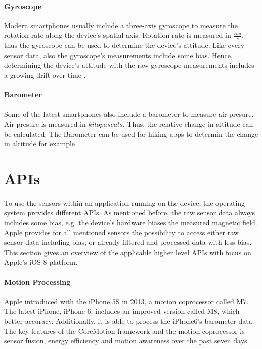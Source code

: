 \paragraph{Gyroscope}

Modern smartphones usually include a three-axis gyroscope to measure the rotation rate along the device's spatial axis.
Rotation rate is measured in $\frac{rad}{s}$, thus the gyroscope can be used to determine the device's attitude.
Like every sensor data, also the gyroscope's measurements include some bias.
Hence, determining the device's attitude with the raw gyroscope measurements includes a growing drift over time \cite{apple:ios_doc_cm, apple:wwdc_2012_pham}.


\paragraph{Barometer}

Some of the latest smartphones also include a barometer to measure air presure.
Air presure is measured in $kilopascals$.
Thus, the relative change in altitude can be calculated.
The Barometer can be used for hiking apps to determin the change in altitude for example \cite{apple:ios_doc_cm}.


\section{\acsp{API}}

To use the sensors within an application running on the device, the operating system provides different \acsp{API}.
As mentioned before, the raw sensor data always includes some bias, e.g. the device's hardware biases the measured magnetic field.
Apple provides for all mentioned sensors the possibility to access either raw sensor data including bias, or already filtered and processed data with less bias.
This section gives an overview of the applicable higher level \acsp{API} with focus on Apple's iOS 8 platform.


\paragraph{Motion Processing}

Apple introduced with the iPhone 5S in 2013, a motion coprocessor called M7.
The latest iPhone, iPhone 6, includes an improved version called M8, which better accuracy. Additionally, it is able to process the iPhone6's barometer data.
The key features of the CoreMotion framework and the motion coprocessor is sensor fusion, energy efficiency and motion awareness over the past seven days.

